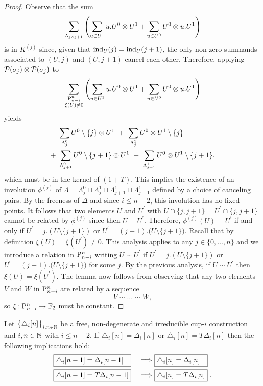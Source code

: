 \begin{proof}
	Observe that the sum
	\[
	\sum_{\Lambda_{j \wedge j+1}} \left( \sum_{u \in U^1} {u.U^0} \ot {U^1} +
	\sum_{u \in U^0} {U^0} \ot {u.U^1} \right)
	\]
	is in $K^{(j)}$ since, given that $\ind_U(j) = \ind_U(j+1)$, the only non-zero summands associated to $(U,j)$ and $(U,j+1)$ cancel each other.
	Therefore, applying $\cP(\sigma_j) \ot \cP(\sigma_j)$ to
	\[
	\sum_{\substack{\P_{n-i}^n \\ \xi(U) \neq 0}} \left(\sum_{u \in U^1} {u.U^0} \ot {U^1} +
	\sum_{u \in U^0} {U^0} \ot {u.U^1} \right)
	\]
	yields
	\begin{align*}
	&\sum_{\Lambda_{j}^0} U^0 \setminus \{j\} \ot {U^1} \ + \
	\sum_{\Lambda_{j}^1} U^0 \ot {U^1} \setminus \{j\} \\ + \
	&\sum_{\Lambda_{j+1}^0} U^0 \setminus \{j+1\} \ot {U^1} \ + \
	\sum_{\Lambda_{j+1}^1} U^0 \ot {U^1} \setminus \{j+1\}.
	\end{align*}
	which must be in the kernel of $(1+T)$.
	This implies the existence of an involution $\phi^{(j)}$ of $\Lambda = \Lambda^0_{j} \sqcup \Lambda^1_{j} \sqcup \Lambda^1_{j+1} \sqcup \Lambda^1_{j+1}$ defined by a choice of canceling pairs.
	By the freeness of $\Delta$ and since $i \leq n-2$, this involution has no fixed points.
	It follows that two elements $U$ and $U^\prime$ with $U \cap \{j, j+1\} = U^\prime \cap \{j, j+1\}$ cannot be related by $\phi^{(j)}$ since then $U = U^\prime$.
	Therefore, $\phi^{(j)}(U) = U^\prime$ if and only if $U^\prime = j.(U \setminus \{j+1\})$ or $U^\prime = (j+1).\big( U \setminus \{j+1\} \big)$.
	Recall that by definition $\xi(U) = \xi(U^\prime) \neq 0$.
	This analysis applies to any $j \in \{0, \dots, n\}$ and we introduce a relation in $\P_{n-i}^n$ writing $U \sim U^\prime$ if $U^\prime = j.(U \setminus \{j+1\})$ or $U^\prime = (j+1).\big( U \setminus \{j+1\} \big)$ for some $j$.
	By the previous analysis, if $U \sim U^\prime$ then $\xi(U) = \xi(U^\prime)$.
	The lemma now follows from observing that any two elements $V$ and $W$ in $\P_{n-i}^n$ are related by a sequence
	\[
	V \sim \dots \sim W,
	\]
	so $\xi \colon \P_{n-i}^n \to \F$ must be constant.
\end{proof}

\begin{lemma} \label{l:second nail}
	Let $\big\{ \triangle_i [n] \big\}_{i,n\in\N}$ be a free, non-degenerate and irreducible \mbox{cup-$i$} construction and $i,n \in \N$ with $i \leq n-2$.
	If $\triangle_i [n] = \Delta_i [n]$ or $\triangle_i [n] = T \Delta_i [n]$ then the following implications hold:
	\begin{alignat*}{2}
	&\boxed{\triangle_i [n-1] = \Delta_i [n-1] \kern 7.3pt}\ &\Longrightarrow\
	&\boxed{\triangle_i [n] = \Delta_i [n] \kern 7.3pt} \\
	&\boxed{\triangle_i [n-1] = T \Delta_i [n-1]}\ &\Longrightarrow\
	&\boxed{\triangle_i [n] = T \Delta_i [n]} \ .
	\end{alignat*}
\end{lemma}


